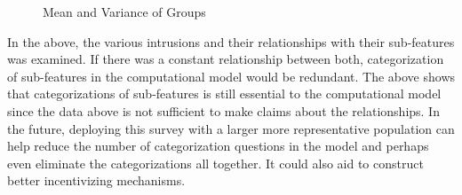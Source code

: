 \begin{figure}[htp]
\hspace{1em}
\newline
\centering
{}
\caption{Mean and Variance of Groups}
\label{fig:st3}
\end{figure}

In the above, the various intrusions and their relationships with their sub-features was examined. If there was a constant relationship between both, categorization of sub-features in the computational model would be redundant. The above shows that categorizations of sub-features is still essential to the computational model since the data above is not sufficient to make claims about the relationships. In the future, deploying this survey with a larger more representative population can help reduce the number of categorization questions in the model and perhaps even eliminate the categorizations all together. It could also aid to construct better incentivizing mechanisms.

